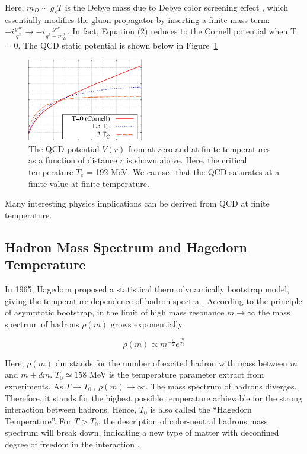 Here, $m_D \sim g_s T$ is the Debye mass due to Debye color screening effect \cite{CSEff}, which essentially modifies the gluon propagator by inserting a finite mass term: $-i \frac{g^{\mu\nu}}{q^2} \rightarrow -i \frac{g^{\mu\nu}}{q^2 - m_D^2}$. In fact, Equation (2) reduces to the Cornell potential when T = 0. The QCD static potential is shown below in Figure~\ref{QCDPotential} \cite{TDepCornell}


\begin{figure}[hbtp]
\begin{center}
\includegraphics[width=0.45\textwidth]{Figures/Chapter1/QCDPotential.png}
\caption{The QCD potential $V(r)$ from at zero and at finite temperatures as a function of distance $r$ is shown above. Here, the critical temperature $T_c $ = 192 MeV. We can see that the QCD saturates at a finite value at finite temperature. }
\label{QCDPotential}
\end{center}
\end{figure} 

Many interesting physics implications can be derived from QCD at finite temperature.


\subsection{Hadron Mass Spectrum and Hagedorn Temperature}

In 1965, Hagedorn proposed a statistical thermodynamically bootstrap model, giving the temperature dependence of hadron spectra \cite{Hagedorn}. According to the principle of asymptotic bootstrap, in the limit of high mass resonance $m \rightarrow \infty$ the mass spectrum of hadrons $\rho(m)$ grows exponentially 

\begin{equation}
\rho (m) \propto m^{-\frac{5}{2}} e^{\frac{m}{T_0}}
\end{equation}

Here, $\rho(m)$ dm stands for the number of excited hadron with mass between $m$ and $m+dm$. $T_0 \simeq 158$ MeV is the temperature parameter extract from experiments. As $T \rightarrow T_0^-$, $\rho(m) \rightarrow \infty$. The mass spectrum of hadrons diverges. Therefore, it stands for the highest possible temperature achievable for the strong interaction between hadrons. Hence, $T_0$ is also called the ``Hagedorn Temperature''. For $ T > T_0$, the description of color-neutral hadrons mass spectrum will break down, indicating a new type of matter with deconfined degree of freedom in the interaction \cite{HagedornDeconfine}.

